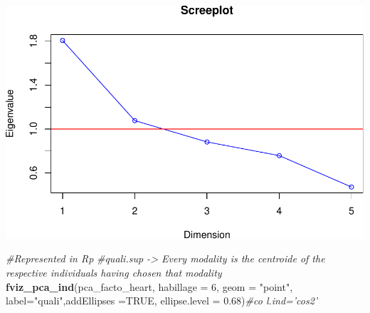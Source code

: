 \documentclass[]{article}
\newenvironment{Shaded}{\begin{snugshade}}{\end{snugshade}}
\newcommand{\KeywordTok}[1]{\textcolor[rgb]{0.13,0.29,0.53}{\textbf{#1}}}
\newcommand{\DataTypeTok}[1]{\textcolor[rgb]{0.13,0.29,0.53}{#1}}
\newcommand{\DecValTok}[1]{\textcolor[rgb]{0.00,0.00,0.81}{#1}}
\newcommand{\FloatTok}[1]{\textcolor[rgb]{0.00,0.00,0.81}{#1}}
\newcommand{\StringTok}[1]{\textcolor[rgb]{0.31,0.60,0.02}{#1}}
\newcommand{\CommentTok}[1]{\textcolor[rgb]{0.56,0.35,0.01}{\textit{#1}}}
\newcommand{\OtherTok}[1]{\textcolor[rgb]{0.56,0.35,0.01}{#1}}
\newcommand{\OperatorTok}[1]{\textcolor[rgb]{0.81,0.36,0.00}{\textbf{#1}}}
\newcommand{\NormalTok}[1]{#1}
\begin{document}
\begin{Shaded}
\end{Shaded}

\includegraphics{project_report_files/figure-latex/unnamed-chunk-10-2.pdf}

\begin{Shaded}
\begin{Highlighting}[]
\CommentTok{#Represented in Rp}
\CommentTok{#quali.sup -> Every modality is the centroide of the respective individuals having chosen that modality}
\KeywordTok{fviz_pca_ind}\NormalTok{(pca_facto_heart, }\DataTypeTok{habillage =} \DecValTok{6}\NormalTok{, }\DataTypeTok{geom =} \StringTok{"point"}\NormalTok{, }\DataTypeTok{label=}\StringTok{"quali"}\NormalTok{,}\DataTypeTok{addEllipses =}\OtherTok{TRUE}\NormalTok{, }\DataTypeTok{ellipse.level =} \FloatTok{0.68}\NormalTok{)}\CommentTok{#co l.ind='cos2'}
\end{Highlighting}
\end{Shaded}
\end{document}
